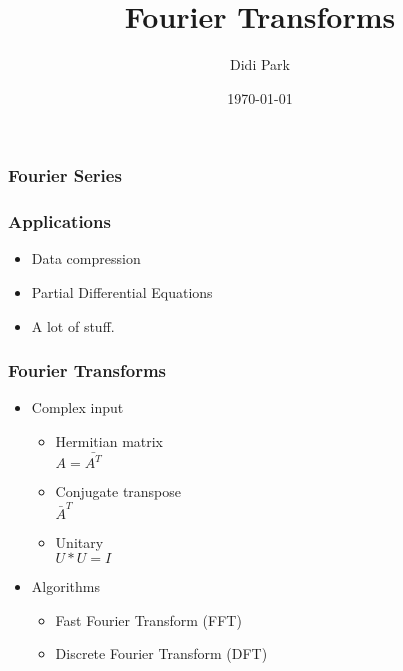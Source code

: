 \documentclass{beamer}
\title{Fourier Transforms}
\author{Didi Park}
\date{\today}
\begin{document}
\frame{\titlepage}


\frame
{
  \frametitle{Fourier Series}

}
\frame
{
  \frametitle{Applications}

  \begin{itemize}
  \item<1-> Data compression
  \item<2-> Partial Differential Equations
  \item<3-> A lot of stuff.   
  \end{itemize}
}
\frame
{
  \frametitle{Fourier Transforms}

  \begin{itemize}
  \item<1-> Complex input
  	\begin{itemize}
		\item Hermitian matrix\\
		$A=\bar{A^T}$
		\item Conjugate transpose\\
		$\bar{A}^T$
		\item Unitary\\
		$U*U=I$
	\end{itemize}
  \item<2-> Algorithms
  	\begin{itemize}
		\item Fast Fourier Transform (FFT)
		\item Discrete Fourier Transform (DFT)
	\end{itemize}
 \end{itemize}
}
\end{document}
